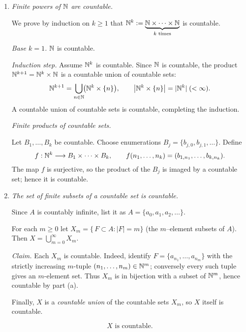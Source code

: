 \documentclass[12pt]{article}
\theoremstyle{definition} %
\theoremstyle{plain} %
\begin{document}
\begin{enumerate}[label=\textbf{(\alph*)}]
\item \textit{Finite powers of \(\Bbb N\) are countable.}

We prove by induction on \(k\ge1\) that
\(\Bbb N^{k}:=\underbrace{\Bbb N\times\dots\times\Bbb N}_{k\text{ times}}\)
is countable.

\emph{Base \(k=1\).}  \(\Bbb N\) is countable.

\emph{Induction step.}  Assume \(\Bbb N^{k}\) is countable.
Since \(\Bbb N\) is countable, the product \(\Bbb N^{k+1}
          =\Bbb N^{k}\times\Bbb N\) is a countable union of countable
sets:
\[
   \Bbb N^{k+1}
      =\bigcup_{n\in\Bbb N}\!\bigl(\Bbb N^{k}\times\{n\}\bigr),
      \qquad
      \bigl|\Bbb N^{k}\times\{n\}\bigr|
         =|\Bbb N^{k}|\;(<\infty).
\]
A countable union of countable sets is countable, completing the
induction.

\smallskip
\textit{Finite products of countable sets.}

Let \(B_{1},\dots,B_{k}\) be countable.
Choose enumerations \(B_{j}=\{b_{j,0},b_{j,1},\dots\}\).
Define
\[
   f: \Bbb N^{k}\longrightarrow B_{1}\times\dots\times B_{k},
   \qquad
   f(n_{1},\dots,n_{k})
     =(b_{1,n_{1}},\dots,b_{k,n_{k}}).
\]
The map \(f\) is surjective, so the product of the \(B_j\) is imaged
by a countable set; hence it is countable.

\item \textit{The set of finite subsets of a countable set is countable.}

Since \(A\) is countably infinite, list it as
\(A=\{a_{0},a_{1},a_{2},\dots\}\).

For each \(m\ge0\) let
\(
   X_{m}=\bigl\{\,F\subset A : |F|=m\bigr\}
\)
(the $m$–element subsets of \(A\)).
Then
\(
   X=\bigcup_{m=0}^{\infty} X_{m}.
\)

\emph{Claim.} Each \(X_{m}\) is countable.  
Indeed, identify \(F=\{a_{n_{1}},\dots,a_{n_{m}}\}\) with the strictly
increasing \(m\)-tuple \((n_{1},\dots,n_{m})\in\Bbb N^{m}\);
conversely every such tuple gives an \(m\)-element set.
Thus \(X_{m}\) is in bijection with a subset of \(\Bbb N^{m}\),
hence countable by part (a).

Finally, \(X\) is a \emph{countable union} of the countable sets
\(X_{m}\), so \(X\) itself is countable.

\[
   \boxed{\;X\text{ is countable.}\;}
\]

\end{enumerate}
\end{document}
